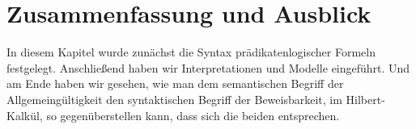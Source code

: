 \section*{Zusammenfassung und Ausblick}

In diesem Kapitel wurde zunächst die Syntax prädikatenlogischer Formeln
festgelegt.
%
Anschließend haben wir  Interpretationen und Modelle eingeführt.
%
Und am Ende haben wir gesehen, wie man dem semantischen Begriff der
Allgemeingültigkeit den syntaktischen Begriff der Beweisbarkeit, \zB
im Hilbert-Kalkül, so gegenüberstellen kann, dass sich die beiden
entsprechen.

\printunitbibliography

\cleardoublepage

